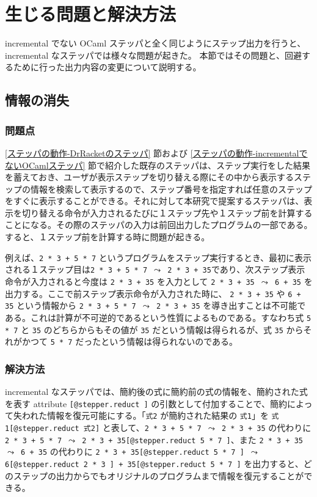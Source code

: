 \section{生じる問題と解決方法}
\label{生じる問題と解決方法}

incremental でない OCaml ステッパと全く同じようにステップ出力を行うと、
incremental なステッパでは様々な問題が起きた。
本節ではその問題と、回避するために行った出力内容の変更について説明する。

\subsection{情報の消失}
\label{生じる問題と解決方法-情報の消失}

\subsubsection{問題点}
\label{生じる問題と解決方法-情報の消失-問題点}
\ref{ステッパの動作-DrRacketのステッパ} 節および \ref{ステッパの動作-incrementalでないOCamlステッパ} 節で紹介した既存のステッパは、ステップ実行をした結果を蓄えておき、ユーザが表示ステップを切り替える際にその中から表示するステップの情報を検索して表示するので、ステップ番号を指定すれば任意のステップをすぐに表示することができる。それに対して本研究で提案するステッパは、表示を切り替える命令が入力されるたびに１ステップ先や１ステップ前を計算することになる。その際のステッパの入力は前回出力したプログラムの一部である。すると、１ステップ前を計算する時に問題が起きる。

例えば、\texttt{2 * 3 + 5 * 7} というプログラムをステップ実行するとき、最初に表示される１ステップ目は\texttt{2 * 3 + 5 * 7 $\leadsto$ 2 * 3 + 35}であり、次ステップ表示命令が入力されると今度は \texttt{2 * 3 + 35} を入力として \texttt{2 * 3 + 35 $\leadsto$ 6 + 35} を出力する。ここで前ステップ表示命令が入力された時に、 \texttt{2 * 3 + 35} や \texttt{6 + 35} という情報から \texttt{2 * 3 + 5 * 7 $\leadsto$ 2 * 3 + 35} を導き出すことは不可能である。これは計算が不可逆的であるという性質によるものである。すなわち式 \texttt{5 * 7} と \texttt{35} のどちらからもその値が \texttt{35} だという情報は得られるが、式 \texttt{35} からそれがかつて \texttt{5 * 7} だったという情報は得られないのである。

\subsubsection{解決方法}
\label{生じる問題と解決方法-情報の消失-解決方法}

incremental なステッパでは、簡約後の式に簡約前の式の情報を、簡約された式を表す attribute \texttt{[@stepper.reduct ]} の引数として付加することで、簡約によって失われた情報を復元可能にする。「\texttt{式2} が簡約された結果の \texttt{式1}」を \texttt{式1[@stepper.reduct 式2]} と表して、\texttt{2 * 3 + 5 * 7 $\leadsto$ 2 * 3 + 35} の代わりに \texttt{2 * 3 + 5 * 7 $\leadsto$ 2 * 3 + 35[@stepper.reduct 5 * 7 ]}、また \texttt{2 * 3 + 35 $\leadsto$ 6 + 35} の代わりに \texttt{2 * 3 + 35[@stepper.reduct 5 * 7 ] $\leadsto$ 6[@stepper.reduct 2 * 3 ] + 35[@stepper.reduct 5 * 7 ]} を出力すると、どのステップの出力からでもオリジナルのプログラムまで情報を復元することができる。

